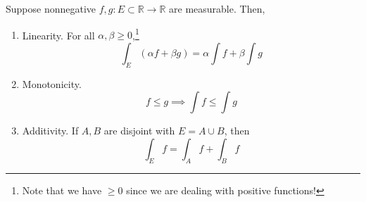   \begin{theorem}
    \label{thm:axiomatic-properties-of-lebesgue-integral-for-2}
    Suppose nonnegative $f, g: E \subset \mathbb{R} \to \mathbb{R}$ are measurable. Then, 
    \begin{enumerate}
      \item Linearity. For all $\alpha, \beta \geq 0$,\footnote{Note that we have $\geq 0$ since we are dealing with positive functions!} 
        \begin{equation}
          \int_E (\alpha f + \beta g) = \alpha \int f + \beta \int g 
        \end{equation}

      \item Monotonicity. 
        \begin{equation}
          f \leq g \implies \int f \leq \int g 
        \end{equation}

      \item Additivity. If $A, B$ are disjoint with $E = A \cup B$, then 
        \begin{equation}
          \int_E f = \int_A f + \int_B f
        \end{equation}
    \end{enumerate}
  \end{theorem}
